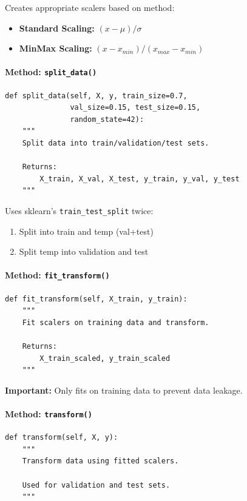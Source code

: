 \documentclass[11pt,a4paper]{article}
\begin{document}
Creates appropriate scalers based on method:
\begin{itemize}
    \item \textbf{Standard Scaling:} $(x - \mu) / \sigma$
    \item \textbf{MinMax Scaling:} $(x - x_{min}) / (x_{max} - x_{min})$
\end{itemize}

\paragraph{Method: \texttt{split\_data()}}
\begin{lstlisting}
def split_data(self, X, y, train_size=0.7,
               val_size=0.15, test_size=0.15,
               random_state=42):
    """
    Split data into train/validation/test sets.

    Returns:
        X_train, X_val, X_test, y_train, y_val, y_test
    """
\end{lstlisting}

Uses sklearn's \texttt{train\_test\_split} twice:
\begin{enumerate}
    \item Split into train and temp (val+test)
    \item Split temp into validation and test
\end{enumerate}

\paragraph{Method: \texttt{fit\_transform()}}
\begin{lstlisting}
def fit_transform(self, X_train, y_train):
    """
    Fit scalers on training data and transform.

    Returns:
        X_train_scaled, y_train_scaled
    """
\end{lstlisting}

\textbf{Important:} Only fits on training data to prevent data leakage.

\paragraph{Method: \texttt{transform()}}
\begin{lstlisting}
def transform(self, X, y):
    """
    Transform data using fitted scalers.

    Used for validation and test sets.
    """
\end{lstlisting}
\end{document}
